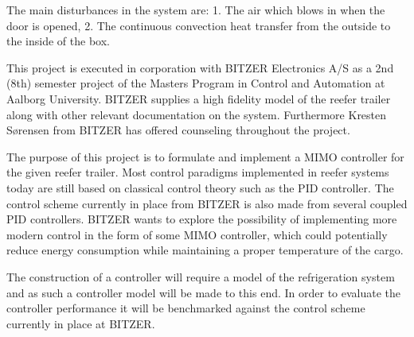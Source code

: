 The main disturbances in the system are: 1. The air which blows in when the door is opened, 2. The continuous convection heat transfer from the outside to the inside of the box.

This project is executed in corporation with BITZER Electronics A/S as a 2nd (8th) semester project of the Masters Program in Control and Automation at Aalborg University. BITZER supplies a high fidelity model of the reefer trailer along with other relevant documentation on the system. Furthermore Kresten Sørensen from BITZER has offered counseling throughout the project.

The purpose of this project is to formulate and implement a MIMO controller for the given reefer trailer. Most control paradigms implemented in reefer systems today are still based on classical control theory such as the PID controller. The control scheme currently in place from BITZER is also made from several coupled PID controllers. BITZER wants to explore the possibility of implementing more modern control in the form of some MIMO controller, which could potentially reduce energy consumption while maintaining a proper temperature of the cargo.

The construction of a controller will require a model of the refrigeration system and as such a controller model will be made to this end. In order to evaluate the controller performance it will be benchmarked against the control scheme currently in place at BITZER.